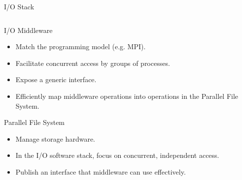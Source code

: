 \documentclass[compress,11pt,xcolor=svgnames,aspectratio=169]{beamer}
\newcommand{\lr}[1]{\textcolor{cyan}{LR: #1}}
\begin{document}
\begin{frame}[fragile]{I/O Stack}
{\begin{columns}
\begin{column}{0.38\textwidth}
\begin{block}{I/O Middleware}
\begin{itemize}
\item Match the programming model (e.g. MPI).
\item Facilitate concurrent access by groups of processes.
\item Expose a generic interface.
\item Efficiently map middleware operations into operations in the Parallel File System.
\end{itemize}
\end{block}
\begin{block}{Parallel File System}
\begin{itemize}
\item Manage storage hardware.
\item In the I/O software stack, focus on concurrent, independent access.
\item Publish an interface that middleware can use effectively.
\end{itemize}
\end{block}
\end{column}
\end{columns}

}

\nocite{esiwace}

\end{frame}

\end{document}
